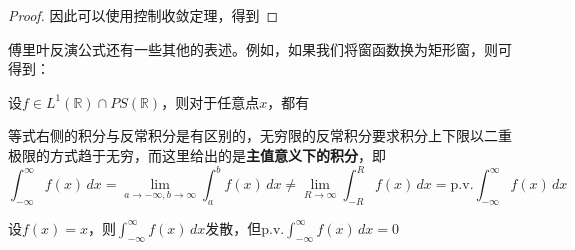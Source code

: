 \begin{proof}
{    }
    因此可以使用控制收敛定理，得到
\end{proof}
傅里叶反演公式还有一些其他的表述。例如，如果我们将窗函数换为矩形窗，则可得到：
\begin{theorem}[傅里叶反演公式]
    \label{thm:fourier_inversion}
    设$f\in L^1(\mathbb{R})\cap PS(\mathbb{R})$，则对于任意点$x$，都有
\end{theorem}
等式右侧的积分与反常积分是有区别的，无穷限的反常积分要求积分上下限以二重极限的方式趋于无穷，而这里给出的是\textbf{主值意义下的积分}，即
\[\int_{-\infty}^{\infty}f(x)\,dx=\lim_{a\to-\infty,b\to\infty}\int_{a}^{b}f(x)\,dx\neq \lim_{R\to\infty}\int_{-R}^{R}f(x)\,dx=\mathrm{p.v.}\int_{-\infty}^{\infty}f(x)\,dx\]
\begin{example}
    设$f(x)=x$，则$\int_{-\infty}^{\infty}f(x)\,dx$发散，但$\mathrm{p.v.}\int_{-\infty}^{\infty}f(x)\,dx=0$
\end{example}
